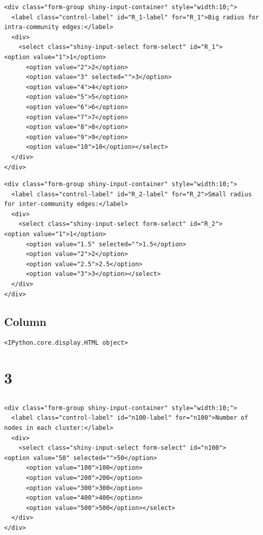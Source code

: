 \documentclass[
  letterpaper,
  DIV=11,
  numbers=noendperiod]{scrartcl}
\begin{document}
\label{input_selects_2-6}
\begin{verbatim}
<div class="form-group shiny-input-container" style="width:10;">
  <label class="control-label" id="R_1-label" for="R_1">Big radius for intra-community edges:</label>
  <div>
    <select class="shiny-input-select form-select" id="R_1">      <option value="1">1</option>
      <option value="2">2</option>
      <option value="3" selected="">3</option>
      <option value="4">4</option>
      <option value="5">5</option>
      <option value="6">6</option>
      <option value="7">7</option>
      <option value="8">8</option>
      <option value="9">9</option>
      <option value="10">10</option></select>
  </div>
</div>
\end{verbatim}

\label{input_selects_2-7}
\begin{verbatim}
<div class="form-group shiny-input-container" style="width:10;">
  <label class="control-label" id="R_2-label" for="R_2">Small radius for inter-community edges:</label>
  <div>
    <select class="shiny-input-select form-select" id="R_2">      <option value="1">1</option>
      <option value="1.5" selected="">1.5</option>
      <option value="2">2</option>
      <option value="2.5">2.5</option>
      <option value="3">3</option></select>
  </div>
</div>
\end{verbatim}

\subsection{Column}\label{column-1}

\label{shiny_metric_backbone_and_spectral_clustering_simulations}
\begin{verbatim}
<IPython.core.display.HTML object>
\end{verbatim}

\section{3}\label{section-4}

\subsection{}\label{section-5}

\label{input_selects_100}
\label{input_selects_100-1}
\begin{verbatim}
<div class="form-group shiny-input-container" style="width:10;">
  <label class="control-label" id="n100-label" for="n100">Number of nodes in each cluster:</label>
  <div>
    <select class="shiny-input-select form-select" id="n100">      <option value="50" selected="">50</option>
      <option value="100">100</option>
      <option value="200">200</option>
      <option value="300">300</option>
      <option value="400">400</option>
      <option value="500">500</option></select>
  </div>
</div>
\end{verbatim}
\end{document}
